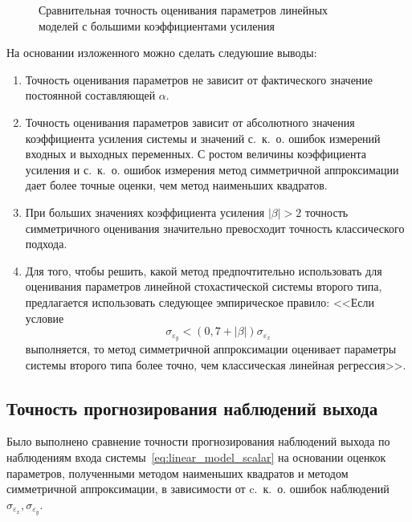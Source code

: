 \begin{figure}[p]
  \vspace{\baselineskip}
  \caption{%
    Сравнительная точность оценивания параметров линейных \\
    моделей с большими коэффициентами усиления
  }\label{fig:comparison_linear_params_beta-big}
\end{figure}

\pagebreak
На основании изложенного можно сделать следуюшие выводы:
\begin{enumerate}
\item Точность оценивания параметров не зависит от фактического значение постоянной
  составляющей \( \alpha \).
\item Точность оценивания параметров зависит от абсолютного значения коэффициента усиления системы и
  значений с.~к.~о. ошибок измерений входных и выходных переменных.
  С ростом величины коэффициента усиления и с.~к.~о. ошибок измерения
  метод симметричной аппроксимации дает более точные оценки,
  чем метод наименьших квадратов.
\item При больших значениях коэффициента усиления \( |\beta| > 2 \)
  точность симметричного оценивания значительно превосходит
  точность классического подхода.
\item Для того, чтобы решить, какой метод предпочтительно использовать для оценивания параметров
  линейной стохастической системы второго типа,
  предлагается использовать следующее эмпирическое правило:
  <<Если условие
  \begin{equation}
    \sigma_{\varepsilon_y} < (0{,}7 + |\beta|) \sigma_{\varepsilon_x}
    \label{eq:rule_linear_param}
  \end{equation}
  выполняется, то метод симметричной аппроксимации оценивает параметры системы
  второго типа более точно, чем классическая линейная регрессия>>.
\end{enumerate}

\pagebreak
\subsection{Точность прогнозирования наблюдений выхода}

Было выполнено сравнение точности прогнозирования наблюдений выхода по
наблюдениям входа системы~\eqref{eq:linear_model_scalar} на основании оценкок параметров,
полученными методом наименьших квадратов и методом симметричной аппроксимации,
в зависимости от c.~к.~о. ошибок наблюдений \( \sigma_{\varepsilon_x}, \sigma_{\varepsilon_y} \).

